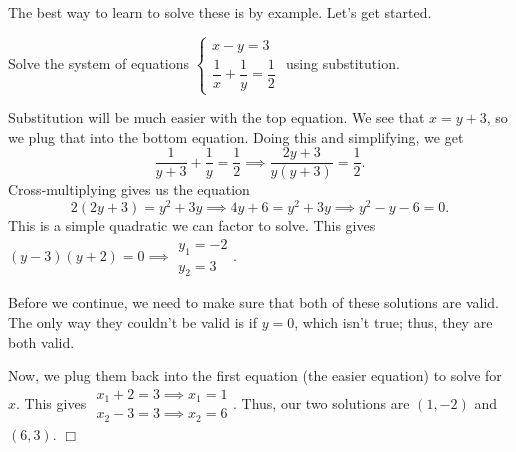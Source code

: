 \documentclass[lang=en,11pt]{elegantbook}
\begin{document}
The best way to learn to solve these is by example.  Let's get started.
\begin{example}
Solve the system of equations $\begin{cases} x-y=3 \\ \dfrac{1}{x}+\dfrac{1}{y}=\dfrac{1}{2} \end{cases}$ using substitution.
\end{example}
\begin{solution}
Substitution will be much easier with the top equation.  We see that $x=y+3$, so we plug that into the bottom equation.  Doing this and simplifying, we get $$\dfrac{1}{y+3}+\dfrac{1}{y}=\dfrac{1}{2} \implies \dfrac{2y+3}{y(y+3)}=\dfrac{1}{2}.$$  Cross-multiplying gives us the equation $$2(2y+3)=y^2+3y \implies 4y+6=y^2+3y \implies y^2-y-6=0.$$  This is a simple quadratic we can factor to solve.  This gives $(y-3)(y+2)=0 \implies \begin{matrix} y_1=-2 \\ y_2=3 \end{matrix}.$

Before we continue, we need to make sure that both of these solutions are valid.  The only way they couldn't be valid is if $y=0$, which isn't true; thus, they are both valid.

Now, we plug them back into the first equation (the easier equation) to solve for $x$.  This gives $\begin{matrix} x_1+2=3 \implies x_1=1 \\ x_2-3=3 \implies x_2=6 \end{matrix}$.  Thus, our two solutions are $\left(1,-2\right)$ and $\left(6,3\right)$.  $\Box$
\end{solution}
\end{document}
